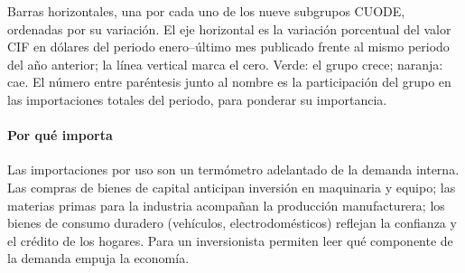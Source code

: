 \begin{leer}
Barras horizontales, una por cada uno de los nueve subgrupos CUODE, ordenadas por su variación. El eje horizontal es la variación porcentual del valor CIF en dólares del periodo enero–último mes publicado frente al mismo periodo del año anterior; la línea vertical marca el cero. Verde: el grupo crece; naranja: cae. El número entre paréntesis junto al nombre es la participación del grupo en las importaciones totales del periodo, para ponderar su importancia.
\end{leer}

\paragraph{Por qué importa}
Las importaciones por uso son un termómetro adelantado de la demanda interna. Las compras de bienes de capital anticipan inversión en maquinaria y equipo; las materias primas para la industria acompañan la producción manufacturera; los bienes de consumo duradero (vehículos, electrodomésticos) reflejan la confianza y el crédito de los hogares. Para un inversionista permiten leer qué componente de la demanda empuja la economía.

